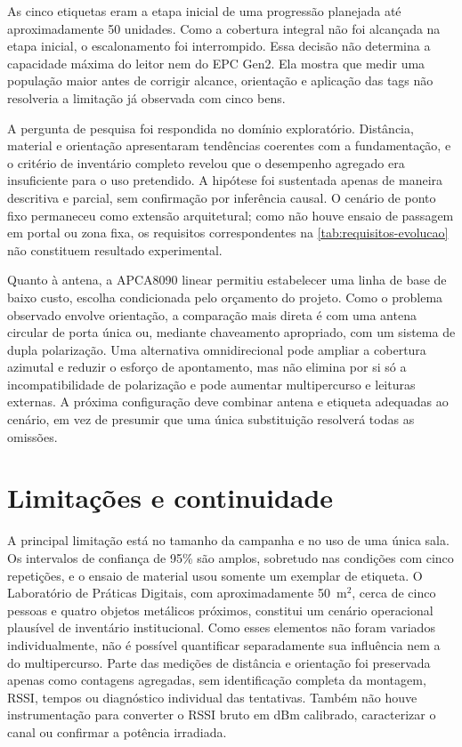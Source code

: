As cinco etiquetas eram a etapa inicial de uma progressão planejada até aproximadamente 50 unidades. Como a cobertura integral não foi alcançada na etapa inicial, o escalonamento foi interrompido. Essa decisão não determina a capacidade máxima do leitor nem do EPC Gen2. Ela mostra que medir uma população maior antes de corrigir alcance, orientação e aplicação das tags não resolveria a limitação já observada com cinco bens.

A pergunta de pesquisa foi respondida no domínio exploratório. Distância, material e orientação apresentaram tendências coerentes com a fundamentação, e o critério de inventário completo revelou que o desempenho agregado era insuficiente para o uso pretendido. A hipótese foi sustentada apenas de maneira descritiva e parcial, sem confirmação por inferência causal. O cenário de ponto fixo permaneceu como extensão arquitetural; como não houve ensaio de passagem em portal ou zona fixa, os requisitos correspondentes na \autoref{tab:requisitos-evolucao} não constituem resultado experimental.

Quanto à antena, a APCA8090 linear permitiu estabelecer uma linha de base de baixo custo, escolha condicionada pelo orçamento do projeto. Como o problema observado envolve orientação, a comparação mais direta é com uma antena circular de porta única ou, mediante chaveamento apropriado, com um sistema de dupla polarização. Uma alternativa omnidirecional pode ampliar a cobertura azimutal e reduzir o esforço de apontamento, mas não elimina por si só a incompatibilidade de polarização e pode aumentar multipercurso e leituras externas. A próxima configuração deve combinar antena e etiqueta adequadas ao cenário, em vez de presumir que uma única substituição resolverá todas as omissões.

\section{Limitações e continuidade}

A principal limitação está no tamanho da campanha e no uso de uma única sala. Os intervalos de confiança de 95\% são amplos, sobretudo nas condições com cinco repetições, e o ensaio de material usou somente um exemplar de etiqueta. O Laboratório de Práticas Digitais, com aproximadamente 50~m$^2$, cerca de cinco pessoas e quatro objetos metálicos próximos, constitui um cenário operacional plausível de inventário institucional. Como esses elementos não foram variados individualmente, não é possível quantificar separadamente sua influência nem a do multipercurso. Parte das medições de distância e orientação foi preservada apenas como contagens agregadas, sem identificação completa da montagem, RSSI, tempos ou diagnóstico individual das tentativas. Também não houve instrumentação para converter o RSSI bruto em dBm calibrado, caracterizar o canal ou confirmar a potência irradiada.

